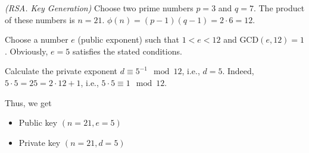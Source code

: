 \begin{example}
\emph{(RSA. Key Generation)}
Choose two prime numbers $p = 3$ and $q = 7$. The product of these numbers is $n = 21$. 
\(
\phi\left(n\right)=\left(p - 1 \right)\left(q - 1 \right) = 2 \cdot 6 = 12
\). 

Choose a number $e$ (public exponent) such that $1 < e < 12$ and  
$\mbox{GCD}\left( e, 12 \right) = 1$. Obviously, $e = 5$ satisfies the stated conditions. 

Calculate the private exponent $d \equiv 5^{-1} \mod{12}$, i.e., $d = 5$. 
Indeed, $5 \cdot 5 = 25 = 2 \cdot 12 + 1$, i.e., $5 \cdot 5 \equiv 1 \mod{12}$.

Thus, we get
\begin{itemize}
\item Public key $\left(n=21, e=5\right)$
\item Private key $\left(n=21, d=5\right)$
\end{itemize}
\label{exAddRSAKeyGen}
\end{example}